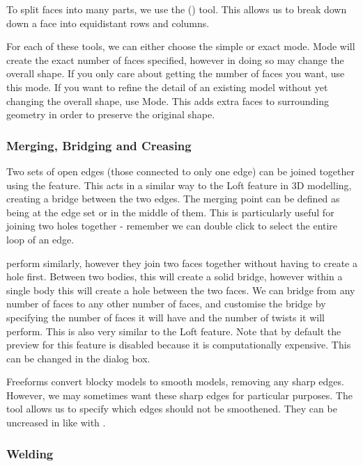 To split faces into many parts, we use the () tool. This allows us to break down down a face into equidistant rows and columns.

For each of these tools, we can either choose the simple or exact mode.  Mode will create the exact number of faces specified, however in doing so may change the overall shape. If you only care about getting the number of faces you want, use this mode. If you want to refine the detail of an existing model without yet changing the overall shape, use  Mode. This adds extra faces to surrounding geometry in order to preserve the original shape.

\subsubsection{Merging, Bridging and Creasing}
\mediumdifficulty

Two sets of open edges (those connected to only one edge) can be joined together using the  feature. This acts in a similar way to the Loft feature in 3D modelling, creating a bridge between the two edges. The merging point can be defined as being at the edge set or in the middle of them. This is particularly useful for joining two holes together - remember we can double click to select the entire loop of an edge.

 perform similarly, however they join two faces together without having to create a hole first. Between two bodies, this will create a solid bridge, however within a single body this will create a hole between the two faces. We can bridge from any number of faces to any other number of faces, and customise the bridge by specifying the number of faces it will have and the number of twists it will perform. This is also very similar to the Loft feature. Note that by default the preview for this feature is disabled because it is computationally expensive. This can be changed in the dialog box.

Freeforms convert blocky models to smooth models, removing any sharp edges. However, we may sometimes want these sharp edges for particular purposes. The  tool allows us to specify which edges should not be smoothened. They can be uncreased in like with .

\subsubsection{Welding}
\easydifficulty

